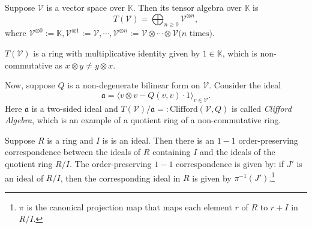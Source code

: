 \begin{example}\label{example:cliffordalgebra}
    Suppose \(\mathcal{V}\) is a vector space over \(\mathbb{K}\). Then its tensor algebra over \(\mathbb{K}\) is \[T(\mathcal{V}) = \bigoplus_{n\ge 0} \mathcal{V}^{\otimes n},\] where \(\mathcal{V}^{\otimes 0} := \mathbb{K}, \mathcal{V}^{\otimes 1}:= \mathcal{V}, \cdots, \mathcal{V}^{\otimes n}:= \mathcal{V} \otimes \cdots \otimes \mathcal{V} (n \text{ times)}\).

    \(T(\mathcal{V})\) is a ring with multiplicative identity given by \(1 \in \mathbb{K}\), which is non-commutative as \(x \otimes y \neq y \otimes x\). 

    Now, suppose \(Q\) is a non-degenerate bilinear form on \(\mathcal{V}\). Consider the ideal \[\mathfrak{a} = \langle v \otimes v - Q(v, v) \cdot 1\rangle_{v \in \mathcal{V}}.\] Here \(\mathfrak{a}\) is a two-sided ideal and \(T(\mathcal{V})/\mathfrak{a} =: \text{Clifford}(\mathcal{V}, Q)\) is called \emph{Clifford Algebra}, which is an example of a quotient ring of a non-commutative ring.
\end{example}
\begin{proposition}\label{proposition:correspondencethm}
    Suppose \(R\) is a ring and \(I\) is is an ideal. Then there is an \(1-1\) order-preserving correspondence between the ideals of \(R\) containing \(I\) and the ideals of the quotient ring \(R/I\). The order-preserving \(1-1\) correspondence is given by: if \(J'\) is an ideal of \(R/I\), then the corresponding ideal in \(R\) is given by \(\pi^{-1}(J')\).\footnote{\(\pi\) is the canonical projection map that maps each element \(r\) of \(R\) to \(r+I\) in \(R/I\).}
\end{proposition}
